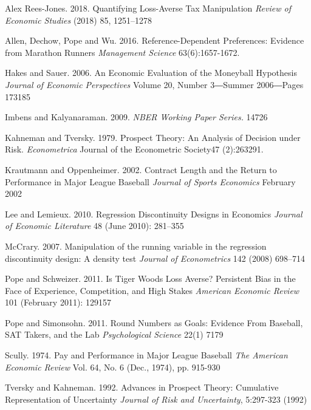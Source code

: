 \documentclass[dvipdfmx, 12pt]{article}
\begin{document}
\begin{thebibliography}{99}
  \bibitem{}Alex Rees-Jones. 2018.
  Quantifying Loss-Averse Tax Manipulation
  \textit{Review of Economic Studies} (2018) 85, 1251–1278

  \bibitem{}Allen, Dechow, Pope and Wu. 2016.
  Reference-Dependent Preferences: Evidence from Marathon Runners \textit{Management Science} 63(6):1657-1672.

  \bibitem{}Hakes and Sauer. 2006.
  An Economic Evaluation of the Moneyball Hypothesis
  \textit{Journal of Economic Perspectives} Volume 20, Number 3―Summer 2006―Pages 173185

  \bibitem{}Imbens and Kalyanaraman. 2009.
  \textit{NBER Working Paper Series.} 14726

  \bibitem{}Kahneman and Tversky. 1979.
  Prospect Theory: An Analysis of Decision under Risk.
  \textit{Econometrica}
  Journal of the Econometric Society47 (2):263291.

  \bibitem{}Krautmann and Oppenheimer. 2002.
  Contract Length and the Return to Performance in Major League Baseball
  \textit{Journal of Sports Economics} February 2002

  \bibitem{}Lee and Lemieux. 2010.
  Regression Discontinuity Designs in Economics
  \textit{Journal of Economic Literature} 48 (June 2010): 281–355

  \bibitem{}McCrary. 2007.
  Manipulation of the running variable in the regression discontinuity design: A density test
  \textit{Journal of Econometrics} 142 (2008) 698–714

  \bibitem{}Pope and Schweizer. 2011.
  Is Tiger Woods Loss Averse? Persistent Bias in the Face of Experience, Competition, and High Stakes
  \textit{American Economic Review} 101 (February 2011): 129157

  \bibitem{}Pope and Simonsohn. 2011.
  Round Numbers as Goals: Evidence From Baseball, SAT Takers, and the Lab
  \textit{Psychological Science} 22(1) 7179

  \bibitem{}Scully. 1974.
  Pay and Performance in Major League Baseball
  \textit{The American Economic Review} Vol. 64, No. 6 (Dec., 1974), pp. 915-930

  \bibitem{}Tversky and Kahneman. 1992.
  Advances in Prospect Theory: Cumulative Representation of Uncertainty
  \textit{Journal of Risk and Uncertainty}, 5:297-323 (1992)

\end{thebibliography}
\end{document}
